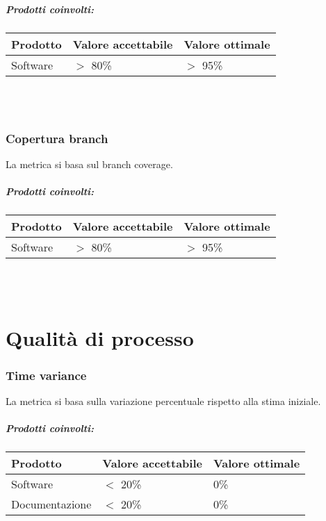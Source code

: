 \documentclass[a4paper, 12pt]{article}
\begin{document}
\subparagraph{Prodotti coinvolti:}
\begin{center}
	\begin{tabularx}{\textwidth}{|X|X|X|}
		\hline
		\textbf{Prodotto} & \textbf{Valore accettabile } & \textbf{Valore ottimale } \\
		\hline
		Software          & $>$ 80\%                     & $>$ 95\%                     \\
		\hline
	\end{tabularx}\\[8pt]
	\mbox{}\\
\end{center}
\subsubsection{Copertura branch}
La metrica si basa sul branch coverage.

\subparagraph{Prodotti coinvolti:}
\begin{center}
	\begin{tabularx}{\textwidth}{|X|X|X|}
		\hline
		\textbf{Prodotto} & \textbf{Valore accettabile } & \textbf{Valore ottimale } \\
		\hline
		Software          & $>$ 80\%                     & $>$ 95\%                     \\
		\hline
	\end{tabularx}\\[8pt]
	\mbox{}\\
\end{center}


\section{Qualità di processo}
\subsubsection{Time variance}
La metrica si basa sulla variazione percentuale rispetto alla stima iniziale.

\subparagraph{Prodotti coinvolti:}
\begin{center}
	\begin{tabularx}{\textwidth}{|X|X|X|}
		\hline
		\textbf{Prodotto} & \textbf{Valore accettabile } & \textbf{Valore ottimale } \\
		\hline
		Software          & $<$ 20\%                     & 0\%                       \\
		\hline
		Documentazione    & $<$ 20\%                     & 0\%                       \\
		\hline
	\end{tabularx}\\[8pt]
	\mbox{}\\
\end{center}
\end{document}
